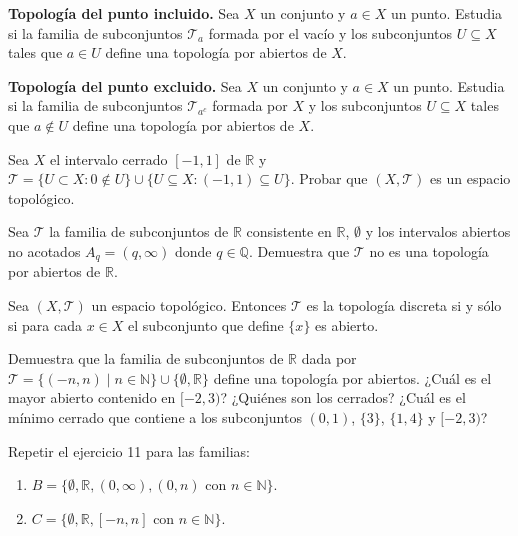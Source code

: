 \begin{ejer}[6]
\textbf{Topología del punto incluido.} Sea $X$ un conjunto y $a \in X$ un punto. Estudia si la familia de subconjuntos $\mathcal{T}_a$ formada por el vacío y los subconjuntos $U \subseteq X$ tales que $a \in U$ define una topología por abiertos de $X$.
\end{ejer}

\begin{ejer}[7]
\textbf{Topología del punto excluido.} Sea $X$ un conjunto y $a \in X$ un punto. Estudia si la familia de subconjuntos $\mathcal{T}_{a^c}$ formada por $X$ y los subconjuntos $U \subseteq X$ tales que $a \notin U$ define una topología por abiertos de $X$.
\end{ejer}

\begin{ejer}[8]
Sea $X$ el intervalo cerrado $[-1,1]$ de $\mathbb{R}$ y $\mathcal{T} = \{U \subset X : 0 \notin U\} \cup \{U \subseteq X : (-1,1) \subseteq U\}$. Probar que $(X, \mathcal{T})$ es un espacio topológico.
\end{ejer}

\begin{ejer}[9]
Sea $\mathcal{T}$ la familia de subconjuntos de $\mathbb{R}$ consistente en $\mathbb{R}$, $\emptyset$ y los intervalos abiertos no acotados $A_q = (q, \infty)$ donde $q \in \mathbb{Q}$. Demuestra que $\mathcal{T}$ no es una topología por abiertos de $\mathbb{R}$.
\end{ejer}

\begin{ejer}[10]
Sea $(X, \mathcal{T})$ un espacio topológico. Entonces $\mathcal{T}$ es la topología discreta si y sólo si para cada $x \in X$ el subconjunto que define $\{x\}$ es abierto.
\end{ejer}

\begin{ejer}[11]
Demuestra que la familia de subconjuntos de $\mathbb{R}$ dada por $\mathcal{T} = \{(-n, n) \mid n \in \mathbb{N}\} \cup \{\emptyset, \mathbb{R}\}$ define una topología por abiertos. ¿Cuál es el mayor abierto contenido en $[-2, 3)$? ¿Quiénes son los cerrados? ¿Cuál es el mínimo cerrado que contiene a los subconjuntos $(0,1)$, $\{3\}$, $\{1,4\}$ y $[-2,3)$?
\end{ejer}

\begin{ejer}[12]
Repetir el ejercicio 11 para las familias:
\begin{enumerate}
    \item[a)] $B = \{\emptyset, \mathbb{R}, (0, \infty), (0, n) \text{ con } n \in \mathbb{N}\}$.
    \item[b)] $C = \{\emptyset, \mathbb{R}, [-n, n] \text{ con } n \in \mathbb{N}\}$.
\end{enumerate}
\end{ejer}

